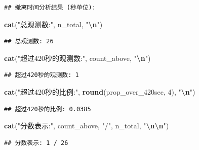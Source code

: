 \documentclass[
]{article}
\newenvironment{Shaded}{\begin{snugshade}}{\end{snugshade}}
\newcommand{\DecValTok}[1]{\textcolor[rgb]{0.00,0.00,0.81}{#1}}
\newcommand{\FunctionTok}[1]{\textcolor[rgb]{0.13,0.29,0.53}{\textbf{#1}}}
\newcommand{\NormalTok}[1]{#1}
\newcommand{\SpecialCharTok}[1]{\textcolor[rgb]{0.81,0.36,0.00}{\textbf{#1}}}
\newcommand{\StringTok}[1]{\textcolor[rgb]{0.31,0.60,0.02}{#1}}
\begin{document}
\begin{verbatim}
## 撤离时间分析结果 (秒单位):
\end{verbatim}

\begin{Shaded}
\begin{Highlighting}[]
\FunctionTok{cat}\NormalTok{(}\StringTok{"总观测数:"}\NormalTok{, n\_total, }\StringTok{"}\SpecialCharTok{\textbackslash{}n}\StringTok{"}\NormalTok{)}
\end{Highlighting}
\end{Shaded}

\begin{verbatim}
## 总观测数: 26
\end{verbatim}

\begin{Shaded}
\begin{Highlighting}[]
\FunctionTok{cat}\NormalTok{(}\StringTok{"超过420秒的观测数:"}\NormalTok{, count\_above, }\StringTok{"}\SpecialCharTok{\textbackslash{}n}\StringTok{"}\NormalTok{)}
\end{Highlighting}
\end{Shaded}

\begin{verbatim}
## 超过420秒的观测数: 1
\end{verbatim}

\begin{Shaded}
\begin{Highlighting}[]
\FunctionTok{cat}\NormalTok{(}\StringTok{"超过420秒的比例:"}\NormalTok{, }\FunctionTok{round}\NormalTok{(prop\_over\_420sec, }\DecValTok{4}\NormalTok{), }\StringTok{"}\SpecialCharTok{\textbackslash{}n}\StringTok{"}\NormalTok{)}
\end{Highlighting}
\end{Shaded}

\begin{verbatim}
## 超过420秒的比例: 0.0385
\end{verbatim}

\begin{Shaded}
\begin{Highlighting}[]
\FunctionTok{cat}\NormalTok{(}\StringTok{"分数表示:"}\NormalTok{, count\_above, }\StringTok{"/"}\NormalTok{, n\_total, }\StringTok{"}\SpecialCharTok{\textbackslash{}n\textbackslash{}n}\StringTok{"}\NormalTok{)}
\end{Highlighting}
\end{Shaded}

\begin{verbatim}
## 分数表示: 1 / 26
\end{verbatim}
\end{document}
